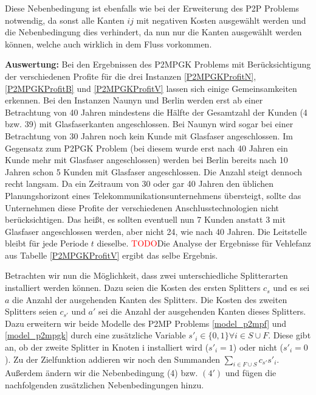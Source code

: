 \documentclass[11pt,a4paper]{article}
\newcommand{\TODO}{\textcolor{red}{TODO}}
\theoremstyle{my_th_style1}
\begin{document}
Diese Nebenbedingung ist ebenfalls wie bei der Erweiterung des P2P Problems notwendig, da sonst alle Kanten $ij$ mit negativen Kosten ausgewählt werden und die Nebenbedingung dies verhindert, da nun nur die Kanten ausgew\"ahlt werden können, welche auch wirklich in dem Fluss vorkommen.
 
 \textbf{Auswertung:} Bei den Ergebnissen des P2MPGK Problems mit Ber\"ucksichtigung der verschiedenen Profite f\"ur die drei Instanzen \eqref{P2MPGKProfitN}, \eqref{P2MPGKProfitB} und \eqref{P2MPGKProfitV} lassen sich einige Gemeinsamkeiten erkennen.
 Bei den Instanzen Naunyn und Berlin werden erst ab einer Betrachtung von 40 Jahren mindestens die H\"alfte der Gesamtzahl der Kunden (4 bzw. 39) mit Glasfaserkanten angeschlossen.
 Bei Naunyn wird sogar bei einer Betrachtung von 30 Jahren noch kein Kunde mit Glasfaser angeschlossen.
 Im Gegensatz zum P2PGK Problem (bei diesem wurde erst nach 40 Jahren ein Kunde mehr mit Glasfaser angeschlossen) werden bei Berlin bereits nach 10 Jahren schon 5 Kunden mit Glasfaser angeschlossen. Die Anzahl steigt dennoch recht langsam. Da ein Zeitraum von 30 oder gar 40 Jahren den \"ublichen Planungshorizont eines Telekommunikationsunternehmens \"ubersteigt, sollte das Unternehmen diese Profite der verschiedenen Anschlusstechnologien nicht ber\"ucksichtigen.  Das heißt, es sollten eventuell nun 7 Kunden anstatt 3 mit Glasfaser angeschlossen werden, aber nicht 24, wie nach 40 Jahren. Die Leitstelle bleibt für jede Periode $t$ dieselbe.
 \TODO Die Analyse der Ergebnisse für Vehlefanz aus Tabelle \ref{P2MPGKProfitV} ergibt das selbe Ergebnis.
 
Betrachten wir nun die Möglichkeit, dass zwei unterschiedliche Splitterarten installiert werden können.
Dazu seien die Kosten des ersten Splitters $c_s$ und es sei $a$ die Anzahl der ausgehenden Kanten des Splitters.
Die Kosten des zweiten Splitters seien $c_{s'}$ und $a'$ sei die Anzahl der ausgehenden Kanten dieses Splitters.
Dazu erweitern wir beide Modelle des P2MP Problems \ref{model_p2mpf} und \ref{model_p2mpgk} durch eine zusätzliche Variable $s'_i \in \{0,1\} \forall i \in S\cup F$.
Diese gibt an, ob der zweite Splitter in Knoten i installiert wird ($s'_i=1$) oder nicht ($s'_i=0$).
Zu der Zielfunktion addieren wir noch den Summanden $\displaystyle\sum_{i \in F \cup S} c_{s'} s'_i$.
Außerdem ändern wir die Nebenbedingung (4) bzw. $(4')$ und fügen die nachfolgenden zusätzlichen Nebenbedingungen hinzu.
\end{document}
